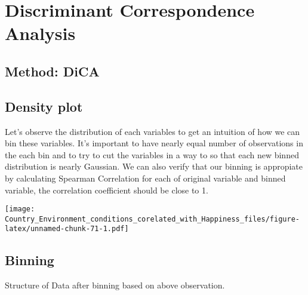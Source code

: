\documentclass[]{book}
\begin{document}
\hypertarget{discriminant-correspondence-analysis}{%
\chapter{Discriminant Correspondence
Analysis}\label{discriminant-correspondence-analysis}}

\hypertarget{method-dica}{%
\section{Method: DiCA}\label{method-dica}}

\hypertarget{density-plot-1}{%
\section{Density plot}\label{density-plot-1}}

Let's observe the distribution of each variables to get an intuition of
how we can bin these variables. It's important to have nearly equal
number of observations in the each bin and to try to cut the variables
in a way to so that each new binned distribution is nearly Gaussian. We
can also verify that our binning is appropiate by calculating Spearman
Correlation for each of original variable and binned variable, the
correlation coefficient should be close to 1.

\texttt{[image: Country\_Environment\_conditions\_corelated\_with\_Happiness\_files/figure-latex/unnamed-chunk-71-1.pdf]}

\hypertarget{binning-1}{%
\section{Binning}\label{binning-1}}

Structure of Data after binning based on above observation.
\end{document}
